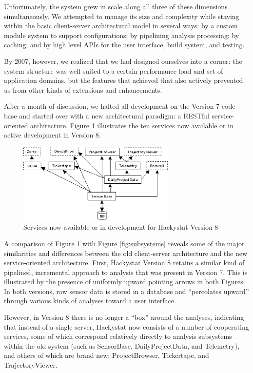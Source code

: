 \documentclass[conference,compsoc]{IEEEtran}
\begin{document}
Unfortunately, the system grew in scale along all three of these dimensions
simultaneously.  We attempted to manage its size and complexity while
staying within the basic client-server architectural model in several ways:
by a custom module system to support configurations; by pipelining analysis
processing; by caching; and by high level APIs for the user interface,
build system, and testing.

By 2007, however, we realized that we had designed ourselves into a
corner: the system structure was well suited to a certain performance
load and set of application domains, but the features that achieved that
also actively prevented us from other kinds of extensions and enhancements.

After a month of discussion, we halted all development on the Version 7
code base and started over with a new architectural paradigm: a RESTful
service-oriented architecture.  Figure \ref{fig:soa} illustrates the
ten services now available or in active development in Version 8.

\begin{figure}[ht]
  \center
  \includegraphics[width=0.7\textwidth]{soa.eps}
  \caption{Services now available or in development for Hackystat Version 8}
  \label{fig:soa}
\end{figure} 

A comparison of Figure \ref{fig:soa} with Figure \ref{fig:subsystems}
reveals some of the major similarities and differences between the old
client-server architecture and the new service-oriented architecture.
First, Hackystat Version 8 retains a similar kind of pipelined, incremental
approach to analysis that was present in Version 7. This is illustrated by
the presence of uniformly upward pointing arrows in both Figures.  In both
versions, raw sensor data is stored in a database and ``percolates upward''
through various kinds of analyses toward a user interface.

However, in Version 8 there is no longer a ``box'' around the analyses,
indicating that instead of a single server, Hackystat now consists of a
number of cooperating services, some of which correspond relatively
directly to analysis subsystems within the old system (such as SensorBase,
DailyProjectData, and Telemetry), and others of which are brand new:
ProjectBrowser, Tickertape, and TrajectoryViewer.
\end{document}

